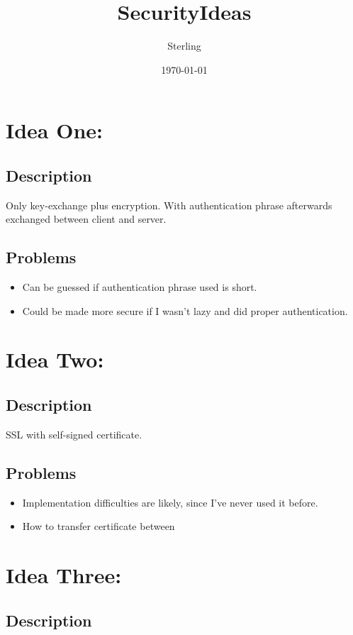 \documentclass[11pt]{article}
\title{SecurityIdeas}
\author{Sterling}
\date{\today}
\begin{document}
\maketitle

\setcounter{tocdepth}{3}
\tableofcontents
\vspace*{1cm}
\section{Idea One:}
\label{sec-1}
\subsection{Description}
\label{sec-1-1}

   Only key-exchange plus encryption. With authentication phrase afterwards exchanged between client and server.
\subsection{Problems}
\label{sec-1-2}

\begin{itemize}
\item Can be guessed if authentication phrase used is short.
\item Could be made more secure if I wasn't lazy and did proper authentication.
\end{itemize}
\section{Idea Two:}
\label{sec-2}
\subsection{Description}
\label{sec-2-1}

   SSL with self-signed certificate.
\subsection{Problems}
\label{sec-2-2}

\begin{itemize}
\item Implementation difficulties are likely, since I've never used it before.
\item How to transfer certificate between
\end{itemize}
\section{Idea Three:}
\label{sec-3}
\subsection{Description}
\label{sec-3-1}
\end{document}

